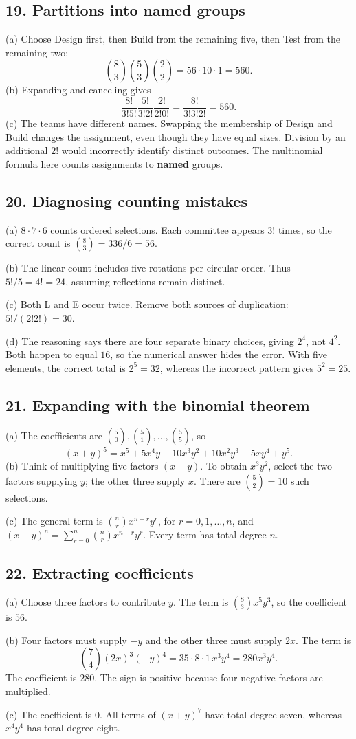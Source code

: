 \documentclass[11pt,letterpaper]{article}
\newcommand{\answer}[2]{\Needspace{2in}\subsection*{#1}#2}
\begin{document}
\answer{19. Partitions into named groups}{(a) Choose Design first, then Build from the remaining five, then Test from the remaining two:
\[
\binom83\binom53\binom22=56\cdot10\cdot1=\boxed{560}.
\]
(b) Expanding and canceling gives
\[
\frac{8!}{3!5!}\frac{5!}{3!2!}\frac{2!}{2!0!}
=\frac{8!}{3!3!2!}=560.
\]
(c) The teams have different names. Swapping the membership of Design and Build changes the assignment, even though they have equal sizes. Division by an additional $2!$ would incorrectly identify distinct outcomes. The multinomial formula here counts assignments to \textbf{named} groups.}

\answer{20. Diagnosing counting mistakes}{(a) $8\cdot7\cdot6$ counts ordered selections. Each committee appears $3!$ times, so the correct count is $\binom83=336/6=\boxed{56}$.

(b) The linear count includes five rotations per circular order. Thus $5!/5=4!=\boxed{24}$, assuming reflections remain distinct.

(c) Both L and E occur twice. Remove both sources of duplication:
$5!/(2!2!)=\boxed{30}$.

(d) The reasoning says there are four separate binary choices, giving $\boxed{2^4}$, not $4^2$. Both happen to equal $16$, so the numerical answer hides the error. With five elements, the correct total is $2^5=32$, whereas the incorrect pattern gives $5^2=25$.}

\answer{21. Expanding with the binomial theorem}{(a) The coefficients are $\binom50,\binom51,\ldots,\binom55$, so
\[
(x+y)^5=x^5+5x^4y+10x^3y^2+10x^2y^3+5xy^4+y^5.
\]
(b) Think of multiplying five factors $(x+y)$. To obtain $x^3y^2$, select the two factors supplying $y$; the other three supply $x$. There are $\binom52=10$ such selections.

(c) The general term is $\binom nr x^{n-r}y^r$, for $r=0,1,\ldots,n$, and
$(x+y)^n=\sum_{r=0}^n\binom nr x^{n-r}y^r$. Every term has total degree $n$.}

\answer{22. Extracting coefficients}{(a) Choose three factors to contribute $y$. The term is $\binom83x^5y^3$, so the coefficient is $\boxed{56}$.

(b) Four factors must supply $-y$ and the other three must supply $2x$. The term is
\[
\binom74(2x)^3(-y)^4=35\cdot8\cdot1\,x^3y^4=280x^3y^4.
\]
The coefficient is $\boxed{280}$. The sign is positive because four negative factors are multiplied.

(c) The coefficient is $\boxed{0}$. All terms of $(x+y)^7$ have total degree seven, whereas $x^4y^4$ has total degree eight.}
\end{document}
